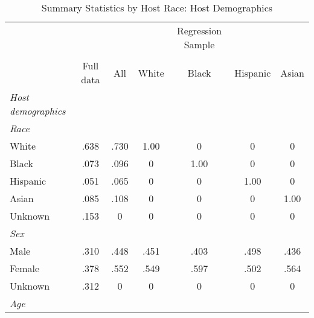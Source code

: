 {
	\begin{longtable}{l*{6}{c}}
		\caption{Summary Statistics by Host Race: Host Demographics} \label{table:demographics}\\
		
		\hline
		&\multicolumn{1}{c}{}&\multicolumn{1}{c}{}&\multicolumn{1}{c}{}&\multicolumn{1}{c}{Regression Sample}&\multicolumn{1}{c}{}&\multicolumn{1}{c}{}\\
		\cline{3-7}\\
			&\multicolumn{1}{c}{Full data}&\multicolumn{1}{c}{All}&\multicolumn{1}{c}{White}&\multicolumn{1}{c}{Black}&\multicolumn{1}{c}{Hispanic}&\multicolumn{1}{c}{Asian}\\
		\hline\hline
		
		
		\textit{Host demographics} \\
		\hline 
		\textit{Race} \\
		\hspace{3mm}White     &.638 &      .730         &       1.00         &      0         &      0 	& 		0        \\
		\hspace{3mm}Black     & .073 &    .096       &       0         &      1.00         &      0 	& 		0         \\
		\hspace{3mm}Hispanic     &.051 &      .065         &       0         &      0         &      1.00 	& 	 0     \\
		\hspace{3mm}Asian     & .085  &   .108      &       0         &      0         &      0 	& 		1.00       \\
		\hspace{3mm}Unknown     &.153 &      0         &       0         &      0         &      0 	& 		0         \\
		[1em]
		\textit{Sex} \\
		\hspace{3mm}Male     & .310 &      .448         &       .451     &      .403         &      .498 	& 		.436        \\
		\hspace{3mm}Female     &.378 &      .552         &       .549        &      .597     &    .502 	& 		.564         \\
		\hspace{3mm}Unknown   & .312 &      0      &       0     &      0         &      0 	&	0         \\
		[1em]
		\textit{Age} \\

\end{longtable}}
